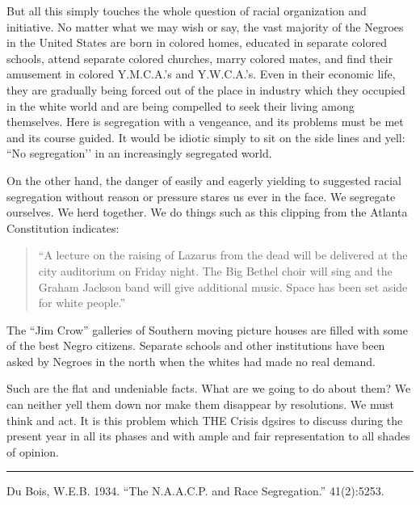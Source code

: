 \documentclass[letterpaper,10pt,english]{jupyterBook}
\begin{document}
\sphinxAtStartPar
But all this simply touches the whole question of racial organization and initiative. No matter what we may wish or say, the vast majority of the Negroes in the United States are born in colored homes, educated in separate colored schools, attend separate colored churches, marry colored mates, and find their amusement in colored Y.M.C.A.’s and Y.W.C.A.’s. Even in their economic life, they are gradually being forced out of the place in industry which they occupied in the white world and are being compelled to seek their living among themselves. Here is segregation with a vengeance, and its problems must be met and its course guided. It would be idiotic simply to sit on the side lines and yell: “No segregation’’ in an increasingly segregated world.

\sphinxAtStartPar
On the other hand, the danger of easily and eagerly yielding to suggested racial segregation without reason or pressure stares us ever in the face. We segregate ourselves. We herd together. We do things such as this clipping from the Atlanta Constitution indicates:
\begin{quote}

\sphinxAtStartPar
“A lecture on the raising of Lazarus from the dead will be delivered at the city auditorium on Friday night. The Big Bethel choir will sing and the Graham Jackson band will give additional music. Space has been set aside for white people.”
\end{quote}

\sphinxAtStartPar
The “Jim Crow” galleries of Southern moving picture houses are filled with some of the best Negro citizens. Separate schools and other institutions have been asked by Negroes in the north when the whites had made no real demand.

\sphinxAtStartPar
Such are the flat and undeniable facts. What are we going to do about them? We can neither yell them down nor make them disappear by resolutions. We must think and act. It is this problem which THE Crisis dgsires to discuss during the present year in all its phases and with ample and fair representation to all shades of opinion.


\bigskip\hrule\bigskip


\sphinxAtStartPar
{} Du Bois, W.E.B. 1934. “The N.A.A.C.P. and Race Segregation.” 41(2):52\sphinxhyphen{}53.
\end{document}
